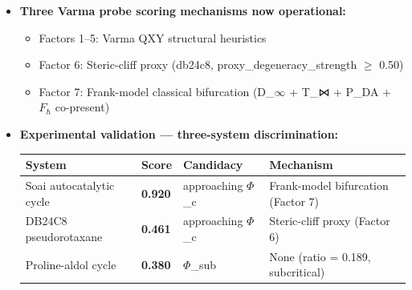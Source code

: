 \documentclass[12pt,a4paper]{article}
\begin{document}
\begin{itemize}
\begin{itemize}
    \begin{itemize}
    \item New scoring factor in \texttt{score\_phi\_c\_candidacy()} (weight 0.25)
    \item Fires when all four Frank co-requisites present: D\_$\infty$ + T\_⋈ + P\_directional + $F_{\hbar}$
    \item Detects pitchfork bifurcation at ee = 0 --- universality class distinct from Varma QXY and steric-cliff mechanisms
\end{itemize}

    \item 
    \textbf{Three Varma probe scoring mechanisms now operational:}

    \begin{itemize}
    \item Factors 1--5: Varma QXY structural heuristics
    \item Factor 6: Steric-cliff proxy (db24c8, proxy\_degeneracy\_strength $\geq$ 0.50)
    \item Factor 7: Frank-model classical bifurcation (D\_$\infty$ + T\_⋈ + P\_DA + $F_{\hbar}$ co-present)
\end{itemize}

    \item 
    \textbf{Experimental validation --- three-system discrimination:}

    \begin{table}[htbp]
\centering
\small
{}
\begin{tabularx}{\textwidth}{>{\centering\arraybackslash}X >{\centering\arraybackslash}X >{\centering\arraybackslash}X >{\centering\arraybackslash}X}
\toprule
\rowcolor{gray!25}\textbf{System} & \textbf{Score} & \textbf{Candidacy} & \textbf{Mechanism} \\
\midrule
\rowcolors{1}{white}{gray!10}
Soai autocatalytic cycle & \textbf{0.920} & approaching $\Phi$\_c & Frank-model bifurcation (Factor 7) \\
DB24C8 pseudorotaxane & \textbf{0.461} & approaching $\Phi$\_c & Steric-cliff proxy (Factor 6) \\
Proline-aldol cycle & \textbf{0.380} & $\Phi$\_sub & None (ratio = 0.189, subcritical) \\
\bottomrule
\end{tabularx}
\end{table}


\end{itemize}
\end{itemize}
\end{document}
